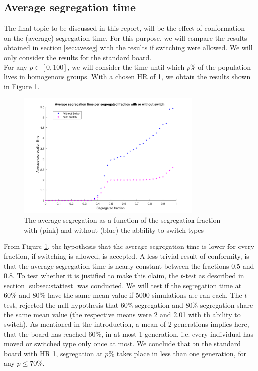 \subsection{Average segregation time}
The final topic to be discussed in this report, will be the effect of conformation on the (average) segregation time. 
For this purpose, we will compare the results obtained in section \ref{sec:aveseg} with the results if switching were allowed. 
We will only consider the results for the standard board.\\
For any \(p\in [0,100]\), we will consider the time until which \(p\%\) of the population lives in homogenous groups. With a chosen HR of 1, we obtain the results shown in Figure \ref{fig:avesegsw}.

\begin{figure}[H]
    \centering
    \includegraphics[width=0.8\textwidth]{Avesegsw2}
    \caption{The average segregation as a function of the segregation fraction with (pink) and without (blue) the abbility to switch types}
    \label{fig:avesegsw}
\end{figure}

From Figure \ref{fig:avesegsw}, the hypothesis that the average segregation time is lower for every fraction, if switching is allowed, is accepted. 
A less trivial result of conformity, is that the average segregation time is nearly constant between the fractions \(0.5\) and \(0.8\). 
To test whether it is justified to make this claim,  the \(t\)-test as described in section \ref{subsec:stattest} was conducted. We will test if the segregation time at \(60\%\) and \(80\%\) have the same mean value if 5000 simulations are ran each. 
The \(t\)-test, rejected the null-hypothesis that \(60\%\) segregation and \(80\%\) segregation share the same mean value (the respective means were 2 and 2.01 with th ability to switch). As mentioned in the introduction, a mean of 2 generations implies here, that the board has reached \(60\%\), in at most 1 generation, i.e. every individual has moved or switched type only once at most.
We conclude that on the standard board with HR 1, segregation at \(p\%\) takes place in less than one generation, for any \(p\leq 70\%\).\\
 
